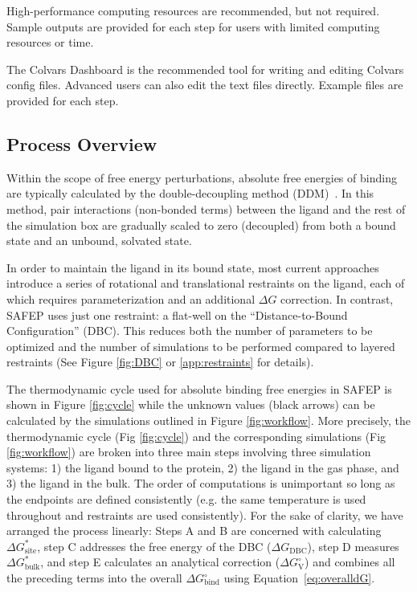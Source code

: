 \documentclass[9pt,tutorial]{Styling/livecoms}
\begin{document}
High-performance computing resources are recommended, but not required. Sample outputs are provided for each step for users with limited computing resources or time.

The Colvars Dashboard is the recommended tool for writing and editing Colvars config files. Advanced users can also edit the text files directly. Example files are provided for each step.

\subsection{Process Overview} \label{sec:processOverview}

Within the scope of free energy perturbations, absolute free energies of binding are typically calculated by the double-decoupling method (DDM)~\cite{Gilson1997, Hamelberg2004, Woo2005}. 
In this method, pair interactions (non-bonded terms) between the ligand and the rest of the simulation box are gradually scaled to zero (decoupled) from both a bound state and an unbound, solvated state.

In order to maintain the ligand in its bound state, most current approaches introduce a series of rotational and translational restraints on the ligand, each of which requires parameterization and an additional $\Delta G$ correction.
In contrast, SAFEP uses just one restraint: a flat-well on the ``Distance-to-Bound Configuration'' (DBC). This reduces both the number of parameters to be optimized and the number of simulations to be performed compared to layered restraints (See Figure \ref{fig:DBC} or \ref{app:restraints} for details).

The thermodynamic cycle used for absolute binding free energies in SAFEP is shown in Figure \ref{fig:cycle} while the unknown values (black arrows) can be calculated by the simulations outlined in Figure \ref{fig:workflow}.
More precisely, the thermodynamic cycle (Fig \ref{fig:cycle}) and the corresponding simulations (Fig \ref{fig:workflow}) are broken into three main steps involving three simulation systems: 1) the ligand bound to the protein, 2) the ligand in the gas phase, and 3) the ligand in the bulk. 
The order of computations is unimportant so long as the endpoints are defined consistently (e.g. the same temperature is used throughout and restraints are used consistently).
For the sake of clarity, we have arranged the process linearly: Steps A and B are concerned with calculating $\Delta G^*_\mathrm{site}$, step C addresses the free energy of the DBC ($\Delta G_\mathrm{DBC}$), step D measures $\Delta G^*_\mathrm{bulk}$, and step E calculates an analytical correction ($\Delta G^\circ_\mathrm{V}$) and combines all the preceding terms into the overall $\Delta G^\circ_\mathrm{bind}$ using Equation~\ref{eq:overalldG}.
\end{document}
